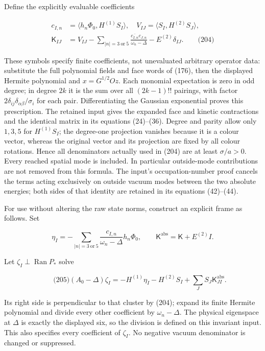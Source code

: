 Define the explicitly evaluable coefficients

\[
\begin{aligned}
 c_{I,n}&=\langle h_n\Phi_0,H^{(1)}S_I\rangle,\quad
 V_{IJ}=\langle S_I,H^{(2)}S_J\rangle,\\
 \mathsf K_{IJ}&=V_{IJ}
   -\sum_{|n|=3\ \mathrm{or}\ 5}
                  \frac{\overline{c_{I,n}}c_{J,n}}{\omega_n-\Delta}
   -E^{(2)}\delta_{IJ}.
 \qquad\text{(204)}
\end{aligned}
\]

These symbols specify finite coefficients, not unevaluated arbitrary
operator data: substitute the full polynomial fields and face words of
(176), then the displayed Hermite polynomial and \(x=G^{1/2}Oz\). Each
monomial expectation is zero in odd degree; in degree \(2k\) it is the
sum over all \((2k-1)!!\) pairings, with factor
\(2\delta_{ij}\delta_{\alpha\beta}/\sigma_i\) for each pair.
Differentiating the Gaussian exponential proves this prescription. The
retained input gives the expanded face and kinetic contractions and the
identical matrix in its equations (24)--(36). Degree and parity allow
only \(1,3,5\) for \(H^{(1)}S_I\); the degree-one projection vanishes
because it is a colour vector, whereas the original vector and its
projection are fixed by all colour rotations. Hence all denominators
actually used in (204) are at least \(\sigma/a>0\). Every reached
spatial mode is included. In particular outside-mode contributions are
not removed from this formula. The input's occupation-number proof
cancels the terms acting exclusively on outside vacuum modes between the
two absolute energies; both sides of that identity are retained in its
equations (42)--(44).

For use without altering the raw state norms, construct an explicit
frame as follows. Set

\[
\eta_I=-\sum_{|n|=3\ \mathrm{or}\ 5}
              \frac{c_{I,n}}{\omega_n-\Delta}h_n\Phi_0,
 \qquad \mathsf K^{\mathrm{abs}}=\mathsf K+E^{(2)}I.
\]

Let \(\zeta_I\perp\operatorname{Ran}P_*\) solve

\[
\qquad\text{(205)}
 (A_0-\Delta)\zeta_I
 =-H^{(1)}\eta_I-H^{(2)}S_I+\sum_JS_J\mathsf K^{\mathrm{abs}}_{JI}.
\]

Its right side is perpendicular to that cluster by (204); expand its
finite Hermite polynomial and divide every other coefficient by
\(\omega_n-\Delta\). The physical eigenspace at \(\Delta\) is exactly
the displayed six, so the division is defined on this invariant input.
This also specifies every coefficient of \(\zeta_I\). No negative vacuum
denominator is changed or suppressed.

